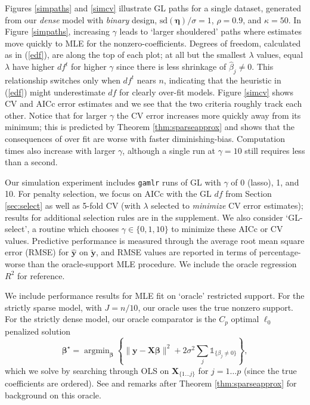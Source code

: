 \documentclass[12pt]{article}
\newcommand{\bs}[1]{\boldsymbol{#1}}
\newcommand{\mr}[1]{\mathrm{#1}}
\newcommand{\bm}[1]{\mathbf{#1}}
\newcommand{\ds}[1]{\mathds{#1}}
\DeclareMathOperator*{\argmin}{argmin}
\begin{document}
Figures \ref{simpaths} and \ref{simcv} illustrate GL paths for a single
dataset, generated from our {\it dense} model with {\it binary} design,   $\mr{sd}(\bm{\eta})/\sigma=1$,  $\rho=0.9$, and  ${\kappa}=50$. In Figure
\ref{simpaths}, increasing $\gamma$ leads to `larger shouldered' paths where
estimates move quickly to MLE for the nonzero-coefficients. Degrees of
freedom, calculated as in (\ref{edf}), are along the top of each plot; at all but the smallest $\lambda$ values, equal
$\lambda$ have higher $df^t$ for higher $\gamma$ since there is less shrinkage
of $\hat\beta_j\neq0$.   This relationship switches only when $df^t$
nears $n$, indicating that the heuristic in (\ref{edf}) might underestimate $df$ for clearly over-fit models.
Figure \ref{simcv} shows CV and AICc error estimates and we see that 
the two criteria roughly track each other.  Notice that
for larger $\gamma$ the CV error increases more quickly away from
its minimum; this is predicted by Theorem \ref{thm:sparseapprox} and shows that the consequences of over fit are worse with
faster diminishing-bias.  Computation times also increase with larger $\gamma$, although a
single run at $\gamma=10$ still requires less than a second.


Our simulation experiment includes \texttt{gamlr} runs of GL with $\gamma$
of 0 (lasso), 1, and 10. For penalty selection, we focus on AICc with the GL $df$
from Section \ref{sec:select} as well as 5-fold CV (with $\lambda$ selected to
{\it minimize} CV error estimates); results for additional selection rules are in the supplement. 
We also consider `GL-select', a routine which chooses $\gamma \in \{0,1,10\}$ to minimize these AICc or CV values.
Predictive performance is measured through the average root
mean square error (RMSE) for  $\bm{\hat y}$ on $\bm{\tilde y}$, and RMSE values are reported  in
terms of percentage-worse than the oracle-support MLE procedure.  We include the
oracle regression $R^2$ for reference.


We include performance results for MLE fit on `oracle' restricted support.  For the strictly sparse model, with $J=n/10$, our oracle uses the true nonzero support.  For the strictly dense model, our oracle comparator is the $C_p$ optimal $\ell_0$ penalized solution
\begin{equation}\label{l0oracle}
\bs{\beta}^{\star} = \argmin_{\bs{\beta}} \left\{ \|\bm{y}-\bm{X}\bs{\beta}\|^2 + 2\sigma^2\sum_j
\ds{1}_{\{\beta_j\neq0\}}\right\},
\end{equation} which we solve by searching through
OLS on $\bm{X}_{\{1\ldots j\}}$ for $j=1\ldots p$ (since the true coefficients are ordered).
See \cite{mallows_comments_1973} and remarks after Theorem \ref{thm:sparseapprox} for background on this oracle.
\end{document}
